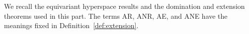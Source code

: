 We recall the equivariant hyperspace results and the domination and
extension theorems used in this part.
The terms AR,
ANR,
AE,
and ANE have the meanings fixed in Definition~\ref{def:extension}.
